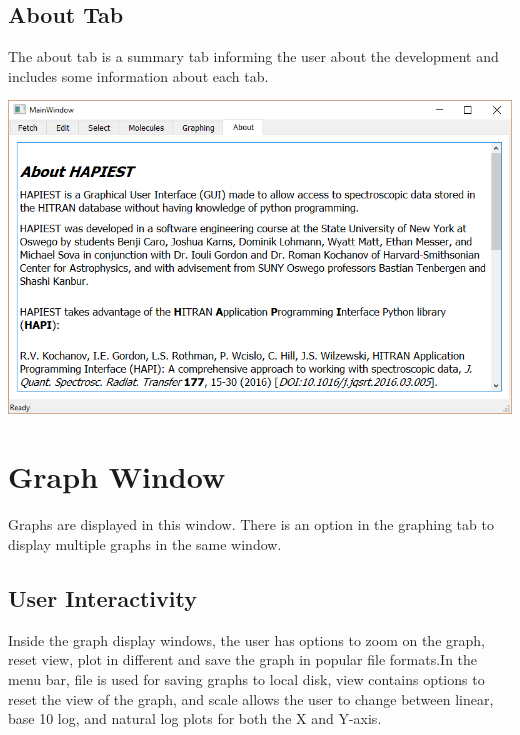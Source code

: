 \documentclass[12pt]{article}
\begin{document}
\subsection{About Tab}
The about tab is a summary tab informing the user about the development and includes some information about each tab.
\begin{center}
\includegraphics[scale = 0.5]{MainWindow_About}
\end{center}
\newpage

\section{Graph Window}
Graphs are displayed in this window. There is an option in the graphing tab to display multiple graphs in the same window. 

\subsection{User Interactivity}
Inside the graph display windows, the user has options to zoom on the graph, reset view, plot in different and save the graph in popular file formats.In the menu bar, file is used for saving graphs to local disk, view contains options to reset the view of the graph, and scale allows the user to change between linear, base 10 log, and natural log plots for both the X and Y-axis.




\end{document}
